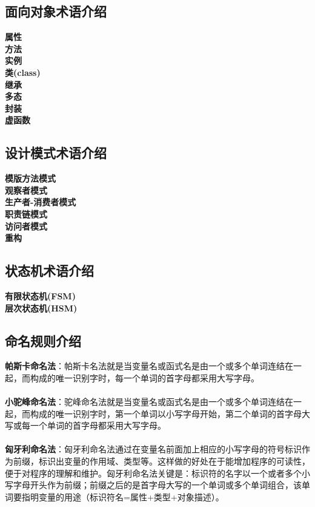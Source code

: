 \documentclass[UTF8,a4paper,12pt]{article}
\begin{document}
	\subsection{面向对象术语介绍}
	\textbf{属性}\\
	\textbf{方法}\\
	\textbf{实例}\\
	\textbf{类(class)}\\
	\textbf{继承}\\
	\textbf{多态}\\
	\textbf{封装}\\
	\textbf{虚函数}\\
	
	\subsection{设计模式术语介绍}
	\textbf{模版方法模式}\\
	\textbf{观察者模式}\\
	\textbf{生产者-消费者模式}\\
	\textbf{职责链模式}\\
	\textbf{访问者模式}\\
	\textbf{重构}\\
	
	\subsection{状态机术语介绍}
	\textbf{有限状态机(FSM)}\\
	\textbf{层次状态机(HSM)}\\
	
	\subsection{命名规则介绍}
	\textbf{帕斯卡命名法}：帕斯卡名法就是当变量名或函式名是由一个或多个单词连结在一起，而构成的唯一识别字时，每一个单词的首字母都采用大写字母。 \\
	\\
	\textbf{小驼峰命名法}：驼峰命名法就是当变量名或函式名是由一个或多个单词连结在一起，而构成的唯一识别字时，第一个单词以小写字母开始，第二个单词的首字母大写或每一个单词的首字母都采用大写字母。\\
	\\
	\textbf{匈牙利命名法}：匈牙利命名法通过在变量名前面加上相应的小写字母的符号标识作为前缀，标识出变量的作用域、类型等。这样做的好处在于能增加程序的可读性，便于对程序的理解和维护。匈牙利命名法关键是：标识符的名字以一个或者多个小写字母开头作为前缀；前缀之后的是首字母大写的一个单词或多个单词组合，该单词要指明变量的用途（标识符名=属性+类型+对象描述）。
	
\end{document}
